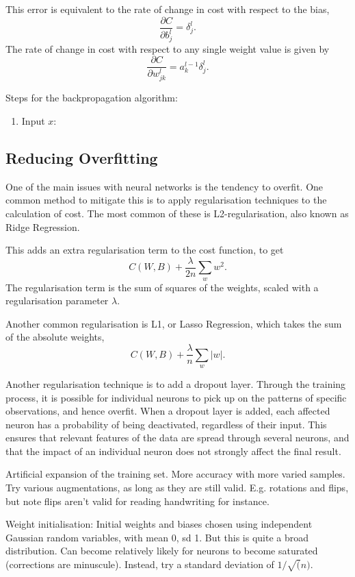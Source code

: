\documentclass[honours,12pt]{unswthesis}
\numberwithin{equation}{section}
\begin{document}
This error is equivalent to the rate of change in cost with respect to the bias,
\[
	\dfrac{\partial C}{\partial b_j^l} = \delta_j^l.
\]
The rate of change in cost with respect to any single weight value is given by
\[
	\dfrac{\partial C}{\partial w_{jk}^l} = a_k^{l-1}\delta_j^l.
\]

Steps for the backpropagation algorithm:
\begin{enumerate}
	\item Input $x$: 
\end{enumerate}



\subsection{Reducing Overfitting}


One of the main issues with neural networks is the tendency to overfit. One common method to mitigate this is to apply regularisation techniques to the calculation of cost. The most common of these is L2-regularisation, also known as Ridge Regression.

This adds an extra regularisation term to the cost function, to get
\[
	C(W,B) + \dfrac{\lambda}{2n}\sum_{w}w^2.
\]
The regularisation term is the sum of squares of the weights, scaled with a regularisation parameter $\lambda$. 

Another common regularisation is L1, or Lasso Regression, which takes the sum of the absolute weights,
\[
	C(W,B) + \dfrac{\lambda}{n}\sum_w|w|.
\]

Another regularisation technique is to add a dropout layer. Through the training process, it is possible for individual neurons to pick up on the patterns of specific observations, and hence overfit. When a dropout layer is added, each affected neuron has a probability of being deactivated, regardless of their input. This ensures that relevant features of the data are spread through several neurons, and that the impact of an individual neuron does not strongly affect the final result.





Artificial expansion of the training set. More accuracy with more varied samples. Try various augmentations, as long as they are still valid. E.g. rotations and flips, but note flips aren't valid for reading handwriting for instance.

Weight initialisation: Initial weights and biases chosen using independent Gaussian random variables, with mean 0, sd 1. But this is quite a broad distribution. Can become relatively likely for neurons to become saturated (corrections are minuscule). Instead, try a standard deviation of $1/\sqrt(n)$.
\end{document}
